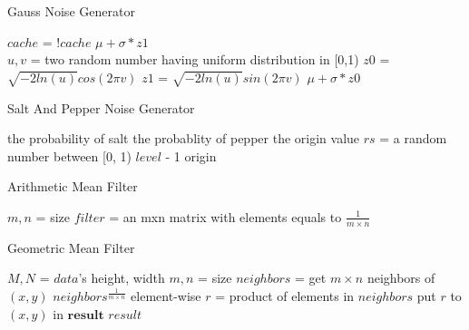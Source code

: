 \documentclass{article}
\begin{document}
  \begin{algorithm}
    \caption{Gauss Noise Generator}
    \label{GaussGenerator}
    \begin{algorithmic}[1]
      \State $cache$ = $!cache$ 
      \State \Return $\mu + \sigma * z1$ 
      \EndIf
      \\
      \State $u, v$ = two random number having uniform distribution in [0,1)
      \State $z0$ = $\sqrt{-2ln(u)}cos(2\pi v)$
      \State $z1$ = $\sqrt{-2ln(u)}sin(2\pi v)$
      \State \Return $\mu + \sigma * z0$
      \EndFunction
    \end{algorithmic}
  \end{algorithm}

  \begin{algorithm}
    \caption{Salt And Pepper Noise Generator}
    \label{SaltPepperGenerator}
    \begin{algorithmic}[1]
       the probability of salt
       the probablity of pepper
       the origin value
      \State $rs$ = a random number between [0, 1)
      \State \Return $level$ - 1
      \State {}
      \Else
      \State \Return origin
      \EndIf
      \EndFunction
    \end{algorithmic}
  \end{algorithm}


  \begin{algorithm}
    \caption{Arithmetic Mean Filter}
    \label{Arithmetic}
    \begin{algorithmic}[1]
    \State $m,n$ = size
    \State $filter$ = an mxn matrix with elements equals to $\frac{1}{m\times n}$
    \State \Return {}
    \EndFunction
    \end{algorithmic}
  \end{algorithm}

  \begin{algorithm}
    \caption{Geometric Mean Filter}
    \label{Geometric}
    \begin{algorithmic}[1]
    \State $M, N$ = $data$'s height, width
    \State $m, n$ = size
    \State $neighbors$ = get $m\times n$ neighbors of $(x,y)$
    \State $neighbors^{\frac{1}{m\times n}}$ element-wise
    \State $r$ = product of elements in $neighbors$
    \State put $r$ to $(x,y)$ in $\mathbf{result}$
    \EndFor
    \State \Return $result$
    \EndFunction
    \end{algorithmic}
  \end{algorithm}
\end{document}
